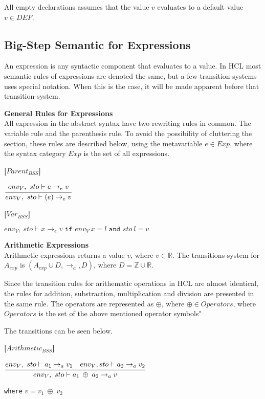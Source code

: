 All empty declarations assumes that the value $v$ evaluates to a default value $v \in DEF$.

\subsection{Big-Step Semantic for Expressions}
An expression is any syntactic component that evaluates to a value.
In HCL most semantic rules of expressions are denoted the same, but a few transition-systems uses special notation.
When this is the case, it will be made apparent before that transition-system.

\textbf{\large{General Rules for Expressions}} \\
All expression in the abstract syntax have two rewriting rules in common.
The variable rule and the parenthesis rule.
To avoid the possibility of cluttering the section, these rules are described below, using the metavariable $e \in Exp$, where the syntax category $Exp$ is the set of all expressions.

\textbf{[$Parent_{BSS}$]}
\begin{center}
	\begin{math}
	\cfrac
		{env_V,\ sto \vdash e \rightarrow_e v}
		{env_V,\ sto \vdash (e) \rightarrow_e v}
	\end{math}
\end{center}

\textbf{[$Var_{BSS}$]}
\begin{center}
	\begin{math}
	env_V,\ sto \vdash x \rightarrow_e v
	\texttt{ if } env_V\ x = l
	\texttt{ and } sto\ l = v
	\end{math}
\end{center}

\textbf{\large{Arithmetic Expressions}}\\
Arithmetic expressions returns a value $v$, where $v \in \mathbb{R}$.
The transitions-system for $A_{exp}$ is $(A_{exp} \cup D, \rightarrow_a, D)$, 
where $D = \mathbb{Z} \cup \mathbb{R}$.

Since the transition rules for arithematic operations in HCL are almost identical, the rules for addition, substraction, multiplication and division are presented in the same rule. 
The operators are represented as $\oplus$, where $\oplus \in Operators$, where $Operators$ is the set of the above mentioned operator symbols"

The transitions can be seen below.

\textbf{[$Arithmetic_{BSS}$]}
\begin{center}
	\begin{math}
	\cfrac
		{env_V,\ sto \vdash a_1 \rightarrow_a v_1 \quad env_V, sto \vdash a_2 \rightarrow_a v_2}
		{env_V,\ sto \vdash a_1 \: \oplus \; a_2 \rightarrow_a v}
	\end{math}
		
	\texttt{where} $v = v_1 \: \oplus \; v_2$
\end{center}

